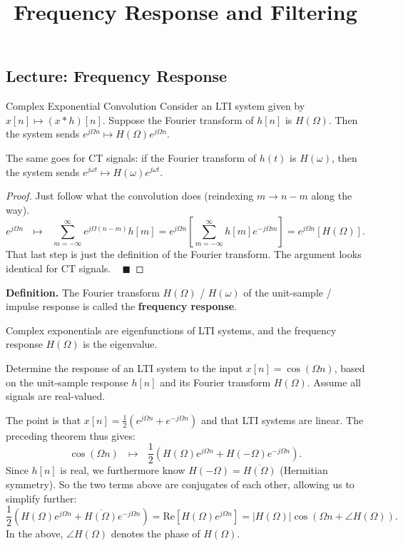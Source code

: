 \title{Frequency Response and Filtering}



\subsection{Lecture: Frequency Response}

\begin{theorem}{Complex Exponential Convolution}
    Consider an LTI system given by $x[n] \mapsto (x * h)[n]$.
    Suppose the Fourier transform of $h[n]$ is $H(\Omega)$.
    Then the system sends $e^{j\Omega n} \mapsto H(\Omega) e^{j\Omega n}$.

    The same goes for CT signals:
    if the Fourier transform of $h(t)$ is $H(\omega)$,
    then the system sends $e^{j\omega t} \mapsto H(\omega) e^{j\omega t}$.
\end{theorem}

\begin{proof}
    Just follow what the convolution does (reindexing $m \to n - m$ along the way).
    \[ e^{j\Omega n} ~~~\mapsto ~~~ \sum_{m = -\infty}^{\infty} e^{j\Omega (n - m)} h[m]
    = e^{j\Omega n} \left[ \sum_{m = -\infty}^{\infty} h[m] e^{-j\Omega m} \right]
    = e^{j\Omega n} \left[ H(\Omega) \right]. \]
    That last step is just the definition of the Fourier transform.
    The argument looks identical for CT signals. ~ $\blacksquare$
\end{proof}

\textbf{Definition.} The Fourier transform $H(\Omega)$ / $H(\omega)$
of the unit-sample / impulse response is called the \textbf{frequency response}.

\begin{remark}
    Complex exponentials are eigenfunctions of LTI systems,
    and the frequency response $H(\Omega)$ is the eigenvalue.
\end{remark}

\begin{problem}
    Determine the response of an LTI system to the input $x[n] = \cos(\Omega n)$,
    based on the unit-sample response $h[n]$ and its Fourier transform $H(\Omega)$.
    Assume all signals are real-valued.
\end{problem}

\begin{solution}
    The point is that $x[n] = \frac{1}{2}\left(e^{j \Omega n} + e^{-j \Omega n}\right)$
    and that LTI systems are linear.
    The preceding theorem thus gives:
    \[ \cos(\Omega n) ~~~ \mapsto ~~~
    \frac{1}{2}\left(H(\Omega) e^{j \Omega n} + H(-\Omega) e^{-j \Omega n}\right). \]
    Since $h[n]$ is real, we furthermore know $H(-\Omega) = \overline{H(\Omega)}$ (Hermitian symmetry).
    So the two terms above are conjugates of each other,
    allowing us to simplify further:
    \[ \frac{1}{2}\left(H(\Omega) e^{j \Omega n} + \overline{H(\Omega)} e^{-j \Omega n}\right)
    = \mathrm{Re}\left[H(\Omega) e^{j \Omega n}\right]
    = |H(\Omega)| \cos\left(\Omega n + \angle H(\Omega)\right). \]
    In the above, $\angle H(\Omega)$ denotes the phase of $H(\Omega)$.
\end{solution}


